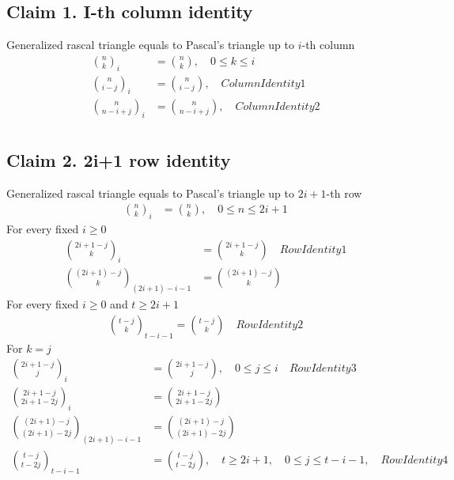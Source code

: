 \documentclass[12pt,letterpaper,oneside,reqno]{amsart}
\newcommand \rascalNumber [3] {\binom{#1}{#2}_{#3}}
\numberwithin{equation}{section}
\begin{document}
\subsection{Claim 1. I-th column identity} Generalized rascal triangle equals to Pascal's triangle up to $i$-th column
\begin{align}
    \rascalNumber{n}{k}{i}          &= \binom{n}{k}, \quad 0 \leq k \leq i \\
    \rascalNumber{n}{i-j}{i}        &= \binom{n}{i-j}, \quad ColumnIdentity1 \\
    \rascalNumber{n}{n-i+j}{i}      &= \binom{n}{n-i+j}, \quad ColumnIdentity2 \\
\end{align}

\subsection{Claim 2. 2i+1 row identity} Generalized rascal triangle equals to Pascal's triangle up to $2i+1$-th row
\begin{align}
    \rascalNumber{n}{k}{i}                  &= \binom{n}{k}, \quad 0 \leq n \leq 2i+1
\end{align}
For every fixed $i \geq 0$
\begin{align}
    \rascalNumber{2i+1-j}{k}{i}             &= \binom{2i+1-j}{k} \quad RowIdentity1 \\
    \rascalNumber{(2i+1)-j}{k}{(2i+1)-i-1}  &= \binom{(2i+1)-j}{k}
\end{align}
For every fixed $i \geq 0$ and $t \geq 2i+1$
\begin{align}
    \rascalNumber{t-j}{k}{t-i-1}            = \binom{t-j}{k} \quad RowIdentity2
\end{align}
For $k=j$
\begin{align*}
    \rascalNumber{2i+1-j}{j}{i}         &= \binom{2i+1-j}{j}, \quad 0 \leq j \leq i \quad RowIdentity3 \\
    \rascalNumber{2i+1-j}{2i+1-2j}{i}   &= \binom{2i+1-j}{2i+1-2j} \\
    \rascalNumber{(2i+1)-j}{(2i+1)-2j}{(2i+1)-i-1}   &= \binom{(2i+1)-j}{(2i+1)-2j} \\
    \rascalNumber{t-j}{t-2j}{t-i-1}     &= \binom{t-j}{t-2j}, \quad t \geq 2i+1, \quad 0 \leq j \leq t-i-1, \quad RowIdentity4 \\
\end{align*}
\end{document}
